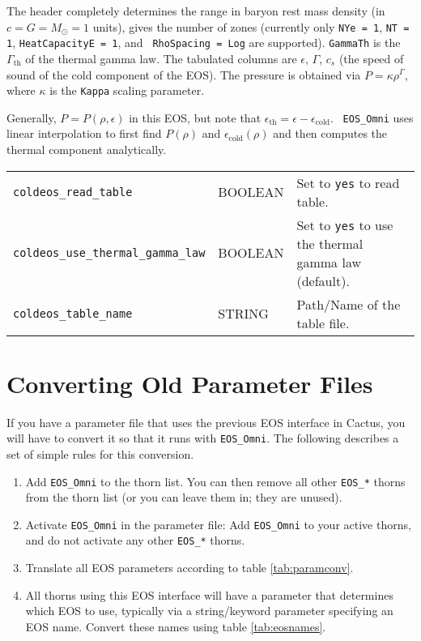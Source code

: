 The header completely determines the range in baryon rest mass density
(in $c=G=M_\odot=1$ units), gives the number of zones (currently only
{\tt NYe = 1}, {\tt NT = 1}, {\tt HeatCapacityE = 1}, and {\tt
  RhoSpacing = Log} are supported). {\tt GammaTh} is the
$\Gamma_\mathrm{th}$ of the thermal gamma law. The tabulated columns
are $\epsilon$, $\Gamma$, $c_s$ (the speed of sound of the cold
component of the EOS). The pressure is obtained via $P= \kappa
\rho^\Gamma$, where $\kappa$ is the {\tt Kappa} scaling parameter.

Generally, $P = P(\rho,\epsilon)$ in this EOS, but note that
$\epsilon_\mathrm{th} = \epsilon - \epsilon_\mathrm{cold}$. {\tt
  EOS\_Omni} uses linear interpolation to first find $P(\rho)$ and
$\epsilon_\mathrm{cold}(\rho)$ and then computes the thermal component
analytically.


\begin{tabular}{lll}
\texttt{coldeos\_read\_table}& BOOLEAN & Set to {\tt yes} to read table.\\
\texttt{coldeos\_use\_thermal\_gamma\_law}& BOOLEAN & Set to {\tt yes} to use the thermal
gamma law (default).\\
\texttt{coldeos\_table\_name}& STRING & Path/Name of the table file.\\
\end{tabular}


\section{Converting Old Parameter Files}

If you have a parameter file that uses the previous EOS interface in
Cactus, you will have to convert it so that it runs with
\texttt{EOS\_Omni}. The following describes a set of simple rules for
this conversion.

\begin{enumerate}
\item Add \texttt{EOS\_Omni} to the thorn list. You can then remove
  all other \texttt{EOS\_*} thorns from the thorn list (or you can
  leave them in; they are unused).
\item Activate \texttt{EOS\_Omni} in the parameter file: Add
  \texttt{EOS\_Omni} to your active thorns, and do not activate any
  other \texttt{EOS\_*} thorns.
\item Translate all EOS parameters according to table
  \ref{tab:paramconv}.
\item All thorns using this EOS interface will have a parameter that
  determines which EOS to use, typically via a string/keyword
  parameter specifying an EOS name. Convert these names using table
  \ref{tab:eosnames}.
\end{enumerate}

